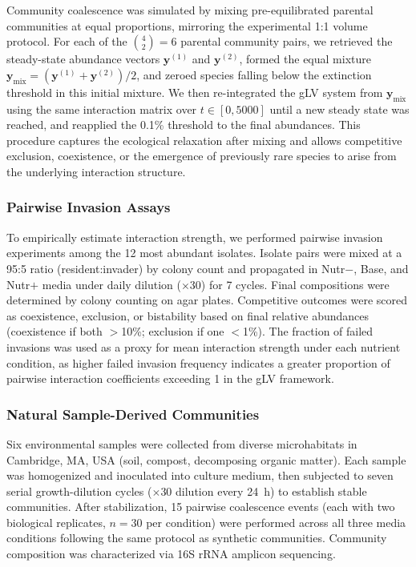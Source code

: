 Community coalescence was simulated by mixing pre-equilibrated parental communities at equal proportions, mirroring the experimental 1:1 volume protocol. For each of the $\binom{4}{2} = 6$ parental community pairs, we retrieved the steady-state abundance vectors $\mathbf{y}^{(1)}$ and $\mathbf{y}^{(2)}$, formed the equal mixture $\mathbf{y}_{\text{mix}} = (\mathbf{y}^{(1)} + \mathbf{y}^{(2)})/2$, and zeroed species falling below the extinction threshold in this initial mixture. We then re-integrated the gLV system from $\mathbf{y}_{\text{mix}}$ using the same interaction matrix over $t \in [0, 5000]$ until a new steady state was reached, and reapplied the 0.1\% threshold to the final abundances. This procedure captures the ecological relaxation after mixing and allows competitive exclusion, coexistence, or the emergence of previously rare species to arise from the underlying interaction structure.


\subsubsection*{Pairwise Invasion Assays}
\label{sec:suppl:methods:invasion}

To empirically estimate interaction strength, we performed pairwise invasion experiments among the 12 most abundant isolates. Isolate pairs were mixed at a 95:5 ratio (resident:invader) by colony count and propagated in Nutr$-$, Base, and Nutr$+$ media under daily dilution ($\times$30) for 7 cycles. Final compositions were determined by colony counting on agar plates. Competitive outcomes were scored as coexistence, exclusion, or bistability based on final relative abundances (coexistence if both $>$10\%; exclusion if one $<$1\%). The fraction of failed invasions was used as a proxy for mean interaction strength under each nutrient condition, as higher failed invasion frequency indicates a greater proportion of pairwise interaction coefficients exceeding 1 in the gLV framework.


\subsubsection*{Natural Sample-Derived Communities}
\label{sec:suppl:natural}

Six environmental samples were collected from diverse microhabitats in Cambridge, MA, USA (soil, compost, decomposing organic matter). Each sample was homogenized and inoculated into culture medium, then subjected to seven serial growth-dilution cycles ($\times$30 dilution every 24~h) to establish stable communities. After stabilization, 15 pairwise coalescence events (each with two biological replicates, $n = 30$ per condition) were performed across all three media conditions following the same protocol as synthetic communities. Community composition was characterized via 16S rRNA amplicon sequencing.


